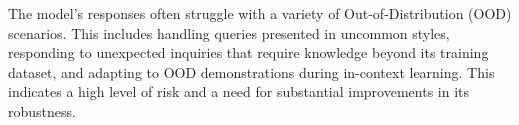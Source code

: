 The model's responses often struggle with a variety of Out-of-Distribution (OOD) scenarios. This includes handling queries presented in uncommon styles, responding to unexpected inquiries that require knowledge beyond its training dataset, and adapting to OOD demonstrations during in-context learning. This indicates a high level of risk and a need for substantial improvements in its robustness.